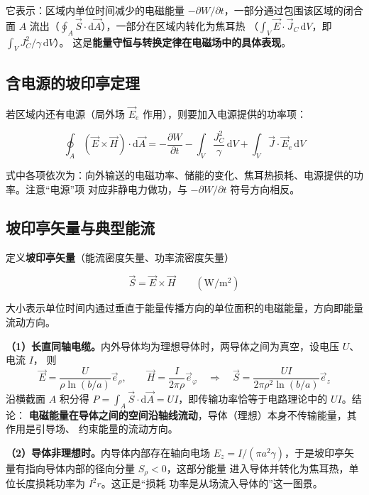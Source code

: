 它表示：区域内单位时间减少的电磁能量 $-\partial W/\partial t$，一部分通过包围该区域的闭合面
$A$ 流出（$\oint_A\vec{S}\cdot \mathrm{d}\vec{A}$），一部分在区域内转化为焦耳热
（$\int_V\vec{E}\cdot\vec{J}_C\,\mathrm{d}V$，即 $\int_V J_C^2/\gamma\,\mathrm{d}V$）。
这是\textbf{能量守恒与转换定律在电磁场中的具体表现}。

\subsection{含电源的坡印亭定理}

若区域内还有电源（局外场 $\vec{E}_e$ 作用），则要加入电源提供的功率项：

\begin{formulaBox}
\[
\oint_{A}(\vec{E}\times\vec{H})\cdot \mathrm{d}\vec{A}
=-\frac{\partial W}{\partial t}
-\int_{V}\frac{J_C^{2}}{\gamma}\,\mathrm{d}V
+\int_{V}\vec{J}\cdot\vec{E}_e\,\mathrm{d}V
\]
\end{formulaBox}

式中各项依次为：向外输送的电磁功率、储能的变化、焦耳热损耗、电源提供的功率。注意“电源”项
对应非静电力做功，与 $-\partial W/\partial t$ 符号方向相反。

\subsection{坡印亭矢量与典型能流}

定义\textbf{坡印亭矢量}（能流密度矢量、功率流密度矢量）
\begin{formulaBox}
\[
\vec{S}=\vec{E}\times\vec{H}\qquad(\mathrm{W/m^2})
\]
\end{formulaBox}
大小表示单位时间内通过垂直于能量传播方向的单位面积的电磁能量，方向即能量流动方向。

\textbf{（1）长直同轴电缆。}内外导体均为理想导体时，两导体之间为真空，设电压 $U$、电流 $I$，
则
\[
\vec{E}=\frac{U}{\rho\ln(b/a)}\vec{e}_\rho,\qquad
\vec{H}=\frac{I}{2\pi\rho}\vec{e}_\varphi
\quad\Longrightarrow\quad
\vec{S}=\frac{UI}{2\pi\rho^{2}\ln(b/a)}\vec{e}_z
\]
沿横截面 $A$ 积分得
$P=\int_{A}\vec{S}\cdot \mathrm{d}\vec{A}=UI$，即传输功率恰等于电路理论中的 $UI$。结论：
\textbf{电磁能量在导体之间的空间沿轴线流动}，导体（理想）本身不传输能量，其作用是引导场、
约束能量的流动方向。

\textbf{（2）导体非理想时。}内导体内部存在轴向电场
$E_z=I/(\pi a^{2}\gamma)$，于是坡印亭矢量有指向导体内部的径向分量 $S_\rho<0$，这部分能量
进入导体并转化为焦耳热，单位长度损耗功率为 $I^{2}r$。这正是“损耗
功率是从场流入导体的”这一图景。

